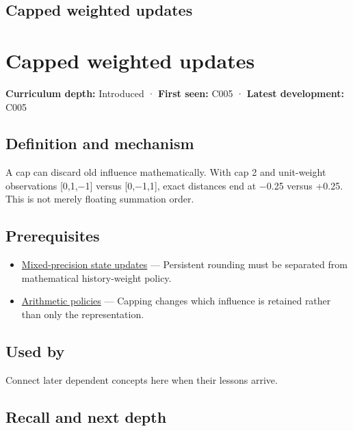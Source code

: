 \hypertarget{appendix-1e45d0613db3}{}
\section*{Capped weighted updates}
\chapter{Capped weighted updates}\label{appendix-1e45d0613db3-capped-weighted-updates}

\textbf{Curriculum depth:} Introduced · \textbf{First seen:} C005 · \textbf{Latest development:} C005

\section{Definition and mechanism}\label{appendix-1e45d0613db3-definition-and-mechanism}

A cap can discard old influence mathematically. With cap 2 and unit-weight observations {[}0,1,−1{]} versus {[}0,−1,1{]}, exact distances end at −0.25 versus +0.25. This is not merely floating summation order.

\section{Prerequisites}\label{appendix-1e45d0613db3-prerequisites}

\begin{itemize}
\tightlist
\item
  \hyperref[appendix-260182e617b7]{Mixed-precision state updates} --- Persistent rounding must be separated from mathematical history-weight policy.
\item
  \hyperref[appendix-2ed044358b82]{Arithmetic policies} --- Capping changes which influence is retained rather than only the representation.
\end{itemize}

\section{Used by}\label{appendix-1e45d0613db3-used-by}

Connect later dependent concepts here when their lessons arrive.

\section{Recall and next depth}\label{appendix-1e45d0613db3-recall-and-next-depth}


